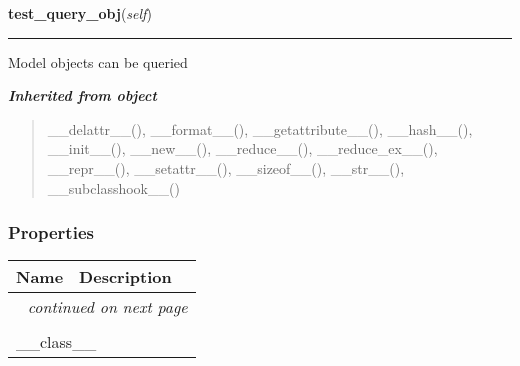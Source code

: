     \label{saip:tests:models:ModelTest:test_query_obj}

    \vspace{0.5ex}

\hspace{.8\funcindent}\begin{boxedminipage}{\funcwidth}

    \raggedright \textbf{test\_query\_obj}(\textit{self})

    \vspace{-1.5ex}

    \rule{\textwidth}{0.5\fboxrule}
\setlength{\parskip}{2ex}
    Model objects can be queried

\setlength{\parskip}{1ex}
    \end{boxedminipage}


\large{\textbf{\textit{Inherited from object}}}

\begin{quote}
\_\_delattr\_\_(), \_\_format\_\_(), \_\_getattribute\_\_(), \_\_hash\_\_(), \_\_init\_\_(), \_\_new\_\_(), \_\_reduce\_\_(), \_\_reduce\_ex\_\_(), \_\_repr\_\_(), \_\_setattr\_\_(), \_\_sizeof\_\_(), \_\_str\_\_(), \_\_subclasshook\_\_()
\end{quote}


  \subsubsection{Properties}

    \vspace{-1cm}
\hspace{\varindent}\begin{longtable}{|p{\varnamewidth}|p{\vardescrwidth}|l}
\cline{1-2}
\cline{1-2} \centering \textbf{Name} & \centering \textbf{Description}& \\
\cline{1-2}
\endhead\cline{1-2}\multicolumn{3}{r}{\small\textit{continued on next page}}\\\endfoot\cline{1-2}
\endlastfoot\multicolumn{2}{|l|}{\textit{Inherited from object}}\\
\multicolumn{2}{|p{\varwidth}|}{\raggedright \_\_class\_\_}\\
\cline{1-2}
\end{longtable}


